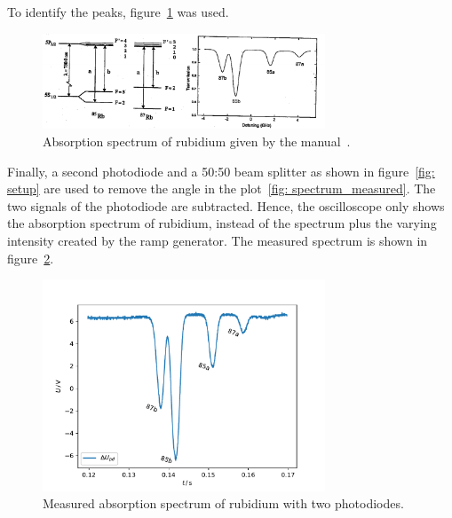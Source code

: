 To identify the peaks, figure~\ref{fig: spectrum_manual} was used.
\begin{figure}
  \centering
  \includegraphics[width = 0.75\textwidth]{./content/images/absorption_spectrum_rubidium.png}
  \caption{Absorption spectrum of rubidium given by the manual~\cite{anleitung60}.}
  \label{fig: spectrum_manual}
\end{figure}
Finally, a second photodiode and a 50:50 beam splitter as shown in figure~\ref{fig: setup}
are used to remove the angle in the plot~\ref{fig: spectrum_measured}. The two signals of
the photodiode are subtracted. Hence, the oscilloscope only shows the
absorption spectrum of rubidium, instead of the spectrum plus the varying intensity created by the
ramp generator. The measured spectrum is shown in figure~\ref{fig: spectrum_measured_straight}.
\begin{figure}
  \centering
  \includegraphics[width = 0.75\textwidth]{../analysis/plots/spectrum_straight.pdf}
  \caption{Measured absorption spectrum of rubidium with two photodiodes.}
  \label{fig: spectrum_measured_straight}
\end{figure}
